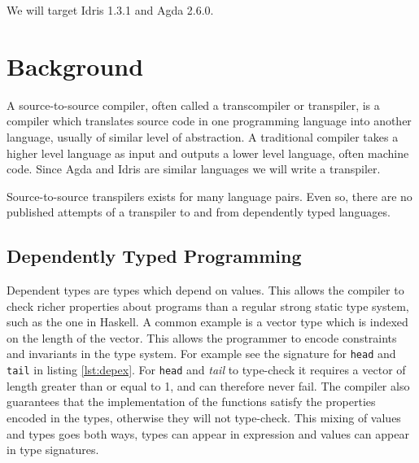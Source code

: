 \documentclass[parskip=half]{scrartcl}
\begin{document}
We will target Idris 1.3.1 and Agda 2.6.0.

\section{Background}

A source-to-source compiler, often called a transcompiler or transpiler, is
a compiler which translates source code in one programming language into
another language, usually of similar level of abstraction. A traditional
compiler takes a higher level language as input and outputs a lower level
language, often machine code.  Since Agda and Idris are similar languages we will write a transpiler.

Source-to-source transpilers exists for many language pairs. Even so, there are
no published attempts of a transpiler to and from dependently
typed languages.




\subsection{Dependently Typed Programming}

Dependent types are types which depend on values.
This allows the compiler to check richer properties about programs than
a regular strong static type system, such as the one in Haskell.
A common example is a vector type which is indexed on the length of
the vector. This allows the programmer to encode constraints and invariants in
the type system. For example see the signature for \texttt{head} and
\texttt{tail} in listing \ref{lst:depex}.  For \texttt{head} and \textit{tail} to type-check it requires a vector of
length greater than or equal to 1, and can therefore never fail.
The compiler also guarantees that the implementation of the functions satisfy
the properties encoded in the types, otherwise they will not type-check.
This mixing of values
and types goes both ways, types can appear in expression and values can appear
in type signatures.

\end{document}
